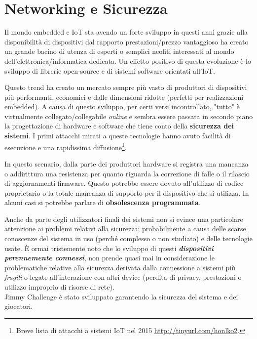 \section{Networking e Sicurezza}

Il mondo embedded e IoT sta avendo un forte sviluppo in questi anni grazie alla disponibilità di dispositivi dal rapporto prestazioni/prezzo vantaggioso ha creato un grande bacino di utenza di esperti o semplici neofiti interessati al mondo dell'elettronica/informatica dedicata. Un effetto positivo di questa evoluzione è lo sviluppo di librerie open-source e di sistemi software orientati all'IoT.

Questo trend ha creato un mercato sempre più vasto di produttori di dispositivi più performanti, economici e dalle dimensioni ridotte (perfetti per realizzazioni embedded).
A causa di questo sviluppo, per certi versi incontrollato, "tutto" è virtualmente collegato/collegabile \textit{online} e sembra essere passata in secondo piano la progettazione di hardware e software che tiene conto della \textbf{sicurezza dei sistemi}. I primi attacchi mirati a queste tecnologie hanno avuto facilità di esecuzione e una rapidissima diffusione\footnote{Breve lista di attacchi a sistemi IoT nel 2015 \url{http://tinyurl.com/honlko2}.}.

In questo scenario, dalla parte dei produttori hardware si registra una mancanza o addirittura una resistenza per quanto riguarda la correzione di falle o il rilascio di aggiornamenti firmware. Questo potrebbe essere dovuto all'utilizzo di codice proprietario o la totale mancanza di supporto per il dispositivo che si utilizza. In alcuni casi si potrebbe parlare di \textbf{obsolescenza programmata}.

Anche da parte degli utilizzatori finali dei sistemi non si evince una particolare attenzione ai problemi relativi alla sicurezza; probabilmente a causa delle scarse conoscenze del sistema in uso (perché complesso o non studiato) e delle tecnologie usate. È ormai tristemente noto che lo sviluppo di questi \textbf{\textit{dispositivi perennemente connessi}}, non prende quasi mai in considerazione le problematiche relative alla sicurezza derivata dalla connessione a sistemi più \textit{fragili} o legate all'interazione con altri device (perdita di privacy, prestazioni o utilizzo improprio di risorse di rete).\\

Jimmy Challenge è stato sviluppato garantendo la sicurezza del sistema e dei giocatori.\\

